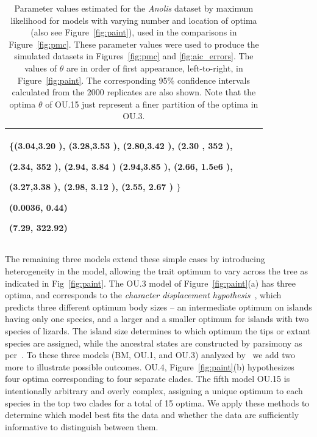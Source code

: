\begin{table}
\begin{center}
\begin{tabular}{|l|l|p{4.2cm}|p{7.8cm}|}
\{(3.04,3.20 ), (3.28,3.53 ), (2.80,3.42 ), (2.30 , 352 ),

(2.34, 352 ), (2.94, 3.84 ) (2.94,3.85 ), (2.66, 1.5e6 ),

(3.27,3.38 ), (2.98, 3.12 ), (2.55, 2.67 ) $\}$

(0.0036, 0.44)

(7.29, 322.92)
\\
\hline
\end{tabular}
\label{tab:pars}
\caption{Parameter values estimated for the {\it Anolis} dataset by maximum likelihood 
for models with varying number and location of optima (also see Figure~\ref{fig:paint}), used in the comparisons in Figure~\ref{fig:pmc}. 
These parameter values were used to produce the simulated datasets in Figures~\ref{fig:pmc} and \ref{fig:aic_errors}.
The values of $\theta$ are in order of first appearance, left-to-right, in Figure~\ref{fig:paint}.
The corresponding 95\% confidence intervals calculated from the 2000 replicates are also shown.  
Note that the optima $\theta$ of OU.15 just represent a finer partition of the optima in OU.3.}
\end{center}
\end{table}


The remaining three models extend these simple cases by introducing heterogeneity in the model, 
allowing the trait optimum to vary across the tree as indicated in Fig~\ref{fig:paint}.  
The OU.3 model of Figure~\ref{fig:paint}(a) has three optima, and corresponds to the {\em character displacement hypothesis}~\citep{Losos1990}, which predicts three different optimum body sizes -- an intermediate optimum on islands having only one species, and a larger and a smaller optimum for islands with two species of lizards.  
The island size determines to which optimum the tips or extant species are assigned, while the ancestral states are constructed by parsimony as per~\citet{Butler2004}.  
To these three models (BM, OU.1, and OU.3) analyzed by~\citet{Butler2004} we add two more to illustrate possible outcomes. 
OU.4, Figure~\ref{fig:paint}(b) hypothesizes four optima corresponding to four separate clades.  
The fifth model OU.15 is intentionally arbitrary and overly complex, assigning a unique optimum to each species in the top two clades for a total of 15 optima.   
We apply these methods to determine which model best fits the data and whether the data are sufficiently informative to distinguish between them.   

